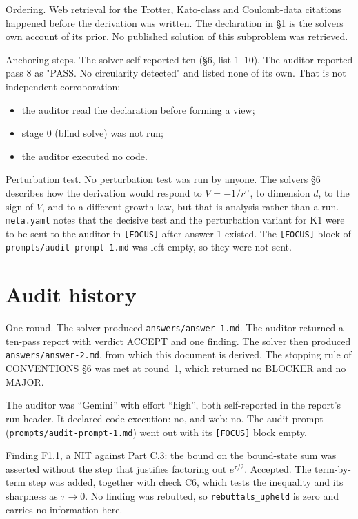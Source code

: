 \documentclass[11pt,a4paper]{article}
\providecommand{\passthrough}[1]{#1}
\providecommand{\tightlist}{\setlength{\itemsep}{0pt}\setlength{\parskip}{0pt}}
\begin{document}
Ordering. Web retrieval for the Trotter, Kato-class and Coulomb-data citations happened before the derivation was written. The declaration in §1 is the solver\textquotesingle s own account of its prior. No published solution of this subproblem was retrieved.

Anchoring steps. The solver self-reported ten (§6, list 1--10). The auditor reported pass 8 as "PASS. No circularity detected" and listed none of its own. That is not independent corroboration:

\begin{itemize}
\tightlist
\item
  the auditor read the declaration before forming a view;
\item
  stage 0 (blind solve) was not run;
\item
  the auditor executed no code.
\end{itemize}

Perturbation test. No perturbation test was run by anyone. The solver\textquotesingle s §6 describes how the derivation would respond to \(V=-1/r^\alpha\), to dimension \(d\), to the sign of \(V\), and to a different growth law, but that is analysis rather than a run. \passthrough{\lstinline!meta.yaml!} notes that the decisive test and the perturbation variant for K1 were to be sent to the auditor in \passthrough{\lstinline![FOCUS]!} after answer-1 existed. The \passthrough{\lstinline![FOCUS]!} block of \passthrough{\lstinline!prompts/audit-prompt-1.md!} was left empty, so they were not sent.


\section{Audit history}\label{app:audit}
One round. The solver produced \texttt{answers/answer-1.md}. The auditor returned
a ten-pass report with verdict ACCEPT and one finding. The solver then produced
\texttt{answers/answer-2.md}, from which this document is derived. The stopping
rule of CONVENTIONS \S6 was met at round~1, which returned no BLOCKER and no MAJOR.

The auditor was ``Gemini'' with effort ``high'', both self-reported in the report's
run header. It declared code execution: no, and web: no. The audit prompt
(\texttt{prompts/audit-prompt-1.md}) went out with its \texttt{[FOCUS]} block empty.

Finding F1.1, a NIT against Part C.3: the bound on the bound-state sum was asserted
without the step that justifies factoring out $e^{\tau/2}$. Accepted. The
term-by-term step was added, together with check C6, which tests the inequality
and its sharpness as $\tau\to0$. No finding was rebutted, so
\texttt{rebuttals\_upheld} is zero and carries no information here.
\end{document}
